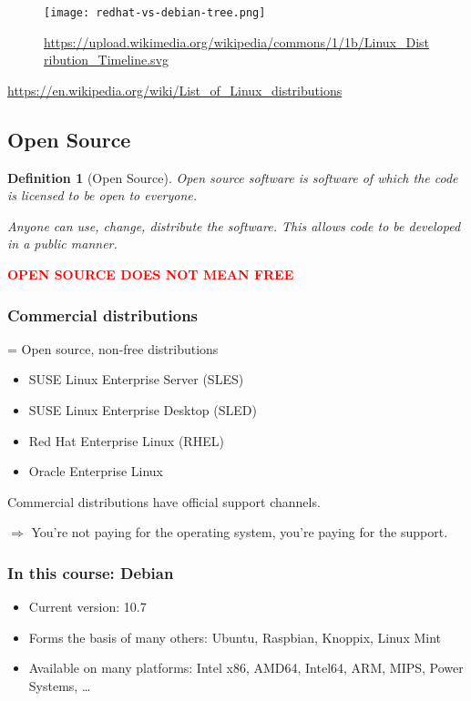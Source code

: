 \documentclass{article}
\newtheorem{theorem}{Definition}[section]
\begin{document}
\begin{figure}[H]
    \centering
    \texttt{[image: redhat-vs-debian-tree.png]}
    \caption{\url{https://upload.wikimedia.org/wikipedia/commons/1/1b/Linux_Distribution_Timeline.svg}}
\end{figure}

\url{https://en.wikipedia.org/wiki/List_of_Linux_distributions}

\subsection{Open Source}

\begin{theorem}[Open Source]
Open source software is software of which the code is licensed to be open to everyone. 

Anyone can use, change, distribute the software. This allows code to be developed in a public manner.
\end{theorem}

\textbf{\textcolor{red}{OPEN SOURCE DOES NOT MEAN FREE}}

\subsubsection{Commercial distributions}

= Open source, non-free distributions

\begin{itemize}
    \item SUSE Linux Enterprise Server (SLES)
    \item SUSE Linux Enterprise Desktop (SLED)
    \item Red Hat Enterprise Linux (RHEL)
    \item Oracle Enterprise Linux
\end{itemize}

Commercial distributions have official support channels.

$\Rightarrow$ You're not paying for the operating system, you're paying for the support.

\subsubsection{In this course: Debian}


\begin{itemize}
    \item Current version: 10.7
    \item Forms the basis of many others: Ubuntu, Raspbian, Knoppix, Linux Mint
    \item Available on many platforms: Intel x86, AMD64, Intel64, ARM, MIPS, Power Systems, \dots
\end{itemize}
\end{document}
